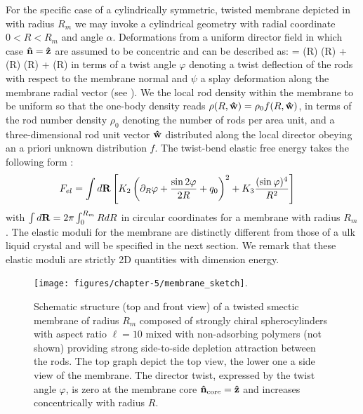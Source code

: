  For the specific case of a cylindrically symmetric, twisted membrane depicted in
  with radius $R_{m}$ we may invoke a cylindrical geometry  with radial coordinate $0<R< R_{m}$ and angle $\alpha$.  Deformations from a uniform director field in which case ${\bf \hat{n}} = {\bf \hat{z}}$ are assumed to be concentric and can be described as:
 \beq
 \bn = \cos \psi (R) \cos  \varphi(R) \bz + \cos \psi (R) \sin \varphi(R) \bal + \sin \psi(R) \bars
 \label{tilt}
 \eeq
in terms of a twist angle  $ \varphi $ denoting a twist deflection of the rods with respect to the membrane normal and $\psi$ a splay deformation along the membrane radial vector (see ).   We the local rod density within the membrane to be uniform so that the one-body density reads $\rho(R, {\bf \hat{w}})  = \rho_{0}f(R,  {\bf \hat{w}})$, in terms of the rod number density $\rho_{0}$ denoting the number of rods per area unit, and a three-dimensional rod unit vector ${\bf \hat{w}}$ distributed along the local director obeying an a priori unknown distribution $f$. The twist-bend elastic free energy  takes the following form \cite{barry_jpcb2009,wensink2018elastic}:
\begin{align}
 F_{el}  &= \int  d {\bf R} \left [ K_{2} \left ( \partial_{R} \varphi + \frac{\sin 2 \varphi}{2R} + q_{0} \right )^{2}  + K_{3}\frac{ ( \sin \varphi )^{4}}{R^{2}} \right   ]
\label{fmem}
\end{align}
with $\int d {\bf R} = 2 \pi \int_{0}^{R_{m}} R dR $ in circular coordinates for a membrane with radius $R_{m}$.
 The  elastic moduli for the membrane are distinctly different from those of a ulk liquid crystal and will be specified in the next section. We remark that these elastic moduli are strictly 2D quantities with dimension energy.

\begin{figure}
\texttt{[image: figures/chapter-5/membrane\_sketch]}.
\caption[Schematic structure (top and front view) of a twisted smectic membrane]{ \label{memsnap} Schematic structure (top and front view) of a twisted smectic membrane of radius $R_{m}$ composed of strongly chiral spherocylinders with aspect ratio $\ell = 10$ mixed with non-adsorbing polymers (not shown) providing strong side-to-side depletion attraction between the rods.  The top graph depict the top view, the lower one a side view of the membrane. The director twist, expressed by the twist angle $\varphi$, is zero at  the membrane  core ${\bf \hat{n}} _{\rm core} = {\bf \hat{z}}$ and increases concentrically with radius $R$.}
\end{figure}


